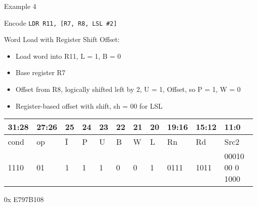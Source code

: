 \documentclass[aspectratio=169]{beamer}
\begin{document}
    \begin{frame}{Example 4}
        \begin{tcolorbox}[
            enhanced,
            colback=androidBlueLight,
            colframe=androidBlue,
            arc=5pt,
            boxrule=1pt,
            title=\textbf{},
            fonttitle=\bfseries,
            coltitle=black,
            top=10pt,
            bottom=8pt,
            left=8pt,
            right=8pt,
            attach boxed title to top left={xshift=10pt, yshift=-\tcboxedtitleheight/2},
            boxed title style={
                colback=androidBlue,    
                colframe=androidBlue,
                arc=3pt,
                boxrule=0pt,
                left=6pt, right=6pt,
                top=3pt, bottom=3pt
            }
            ]
            Encode     \texttt{LDR R11, [R7, R8, LSL \#2]}
        \end{tcolorbox}
    
        Word Load with Register Shift Offset:
        \begin{itemize}
            \item Load word into R11, L = 1, B = 0
            \item Base register R7
            \item Offset from R8, logically shifted left by 2, U = 1, Offset, so P = 1, W = 0
            \item Register-based offset with shift, sh = 00 for LSL
        \end{itemize}
    
        \footnotesize 
        \begin{center}
            \renewcommand{\arraystretch}{1.2}
            \begin{tabular}{|p{3.0em}|p{3.0em}|p{1.5em}|p{1.5em}|p{1.5em}|p{1.5em}|p{1.5em}|p{1.5em}|p{3.0em}|p{3.0em}|p{7.0em}|}
            \hline
            31:28 & 27:26 & 25 & 24 & 23 & 22 & 21 & 20 & 19:16 & 15:12 & 11:0\\
            \hline
            cond & op & \=I & P & U & B & W & L & Rn & Rd & Src2\\
            \hline
            1110 & 01 & 1 & 1 & 1 & 0 & 0 & 1 & 0111 & 1011 & 00010 00 0 1000 \\
            \hline
            \end{tabular}


        \vspace{0.5em}

        0x E797B108

        \end{center}
        
    \end{frame}
\end{document}
